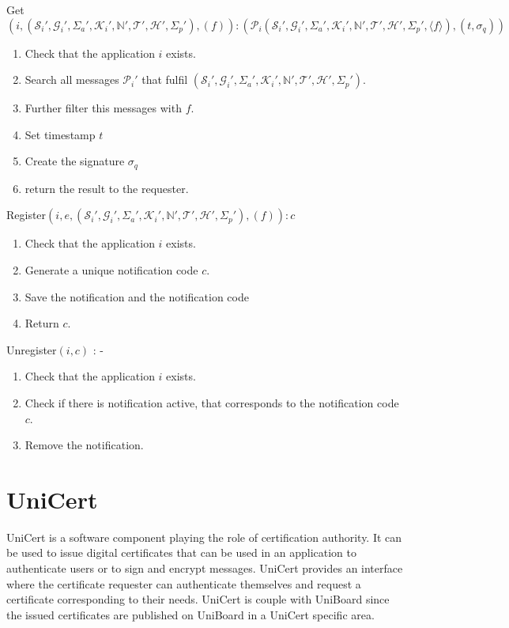 \documentclass[bibtotoc,halfparskip,oneside]{scrreprt}
\begin{document}
Get$(i,(\mathcal{S}_i',\mathcal{G}_i',\Sigma_a',\mathcal{K}_i',\mathbb{N}',\mathcal{T}',\mathcal{H}',\Sigma_p'),(f)): (\mathcal{P}_i(\mathcal{S}_i',\mathcal{G}_i',\Sigma_a',\mathcal{K}_i',\mathbb{N}',\mathcal{T}',\mathcal{H}',\Sigma_p',\langle f\rangle), (t, \sigma_q))$
\begin{enumerate}
	\item Check that the application $i$ exists.
	\item Search all messages $\mathcal{P}_i'$ that fulfil $(\mathcal{S}_i',\mathcal{G}_i',\Sigma_a',\mathcal{K}_i',\mathbb{N}',\mathcal{T}',\mathcal{H}',\Sigma_p')$.
	\item Further filter this messages with $f$.
	\item Set timestamp $t$
	\item Create the signature $\sigma_q$
	\item return the result to the requester.
\end{enumerate}
Register$(i, e, (\mathcal{S}_i',\mathcal{G}_i',\Sigma_a',\mathcal{K}_i',\mathbb{N}',\mathcal{T}',\mathcal{H}',\Sigma_p'),(f) ): c$
\begin{enumerate}
	\item Check that the application $i$ exists.
	\item Generate a unique notification code $c$.
	\item Save the notification and the notification code
	\item Return $c$.
\end{enumerate}
Unregister$(i, c)$ : -
\begin{enumerate}
	\item Check that the application $i$ exists.
	\item Check if there is notification active, that corresponds to the notification code $c$.
	\item Remove the notification.
\end{enumerate}


\chapter{UniCert}

UniCert is a software component playing the role of certification authority. It can be used to issue digital certificates that can be used in an application to authenticate users or to sign and encrypt messages. UniCert provides an interface where the certificate requester can authenticate themselves and request a certificate corresponding to their needs. UniCert is couple with UniBoard since the issued certificates are published on UniBoard in a UniCert specific area. 
\end{document}
